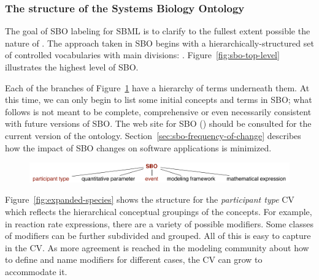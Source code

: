 \subsubsection{The structure of the Systems Biology Ontology}

The goal of SBO labeling for SBML is to clarify to the fullest
extent possible the nature of  .  The
approach taken in SBO begins with a hierarchically-structured set
of controlled vocabularies with  main divisions: 
.
Figure~\vref{fig:sbo-top-level} illustrates the highest level of
SBO.

Each of the  branches of Figure~\ref{fig:sbo-top-level} have a
hierarchy of terms underneath them.  At this time, we can only
begin to list some initial concepts and terms in SBO; what follows
is not meant to be complete, comprehensive or even necessarily
consistent with future versions of SBO.  The web site for SBO
(\sboref) should be consulted for the current version of the
ontology.  Section~\ref{sec:sbo-frequency-of-change} describes how
the impact of SBO changes on software applications is minimized.

\begin{figure}[tbh]
  \vspace*{1ex}
  \centering
  \includegraphics[scale = 0.8]{figs/sbo-top-level}
  \vspace*{1ex}
  \caption{}
  \label{fig:sbo-top-level}
\end{figure}

Figure~\vref{fig:expanded-species} shows the structure
for the \emph{participant type} CV which reflects the hierarchical
conceptual groupings of the concepts. For example, in reaction
rate expressions, there are a variety of possible modifiers.  Some
classes of modifiers can be further subdivided and grouped.  All
of this is easy to capture in the CV.  As more agreement is
reached in the modeling community about how to define and name
modifiers for different cases, the CV can grow to accommodate it.

